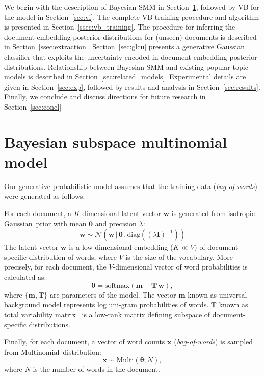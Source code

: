 \documentclass[journal]{IEEEtran}
\newcommand{\mb}[1]{\bm{#1}}
\newcommand{\bs}[1]{\bm{#1}}
\newcommand{\Mul}{\(\mathrm{Multinomial}\)}
\newcommand{\Gau}{\(\mathrm{Gaussian}\)}
\newcommand{\bow}{\textit{bag-of-words}}
\begin{document}
We begin with the description of Bayesian SMM in Section~\ref{sec:baysmm},
followed by VB for the model in Section~\ref{sec:vi}. The complete VB training
procedure and algorithm is presented in Section~\ref{ssec:vb_training}. The
procedure for inferring the document embedding posterior distributions for
(unseen) documents is described in Section~\ref{ssec:extraction}.
Section~\ref{sec:glcu} presents a generative Gaussian classifier that exploits
the uncertainty encoded in document embedding posterior distributions.
Relationship between Bayesian SMM and existing popular topic models is
described in Section~\ref{sec:related_models}. Experimental details are given
in Section~\ref{sec:exp}, followed by results and analysis in
Section~\ref{sec:results}. Finally, we conclude and discuss directions for 
future research in Section~\ref{sec:concl}

\section{Bayesian subspace multinomial model}
\label{sec:baysmm}
Our generative probabilistic model assumes that the training data (\bow)
were generated as follows:

For each document, a \(K\)-dimensional latent vector \(\mb{w}\) is
generated from isotropic \Gau~prior with mean \(\mb{0}\) and precision \(\lambda\):
\begin{equation}
\label{eq_prior}
\mb{w} \sim \mathcal{N}(\mb{w} \,|\, \bs{0}\,, \mathrm{diag}((\lambda \mb{I})^{-1}))
\end{equation}
The latent vector \(\mb{w}\) is a low dimensional embedding (\(K \ll V\)) of
document-specific distribution of words, where \(V\) is the size of the 
vocabulary. More precisely, for each document, the \(V\)-dimensional vector of 
word probabilities is calculated as:
\begin{equation}
\bs{\theta} = \mathrm{softmax}(\mb{m} + \mb{T}\, \mb{w}),
\end{equation}
where \(\{\mb{m}, \mb{T}\}\) are parameters of the model. The vector \(\mb{m}\) 
known as universal background model represents log uni-gram probabilities of 
words. \(\mb{T}\) known as total variability 
matrix~\cite{Marcel:2010:SMM,Najim:2011:ivec} is a low-rank matrix defining 
subspace of document-specific distributions.

Finally, for each document, a vector of word counts \(\mb{x}\) (\bow) is sampled from \Mul~distribution:
\begin{equation}
\label{eq_sample_x}
\mb{x} \sim \mathrm{Multi}(\bs{\theta};N),
\end{equation}
where \(N\) is the number of words in the document.
\end{document}
